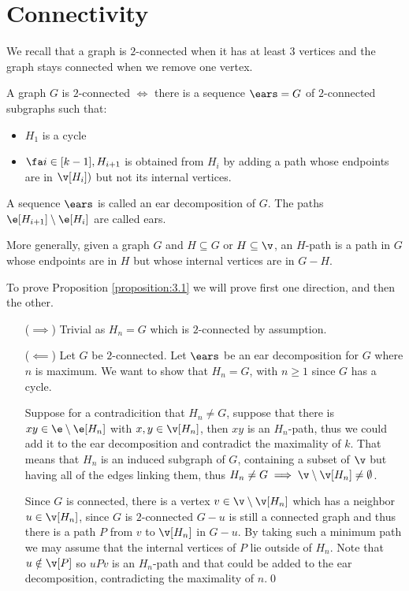 \chapter{Connectivity}
We recall that a graph is $2$-connected when it has at least $3$ vertices and the graph stays connected when we remove one vertex.
\begin{customproposition}{3.1}
\label{proposition:3.1}
    A graph $G$ is $2$-connected $\iff$ there is a sequence $\ears = G$ of $2$-connected subgraphs such that:
    \begin{itemize}
        \item $H_1$ is a cycle
        \item $\fa i \in [k - 1], H_{i + 1}$ is obtained from $H_i$ by adding a path whose endpoints are in $\v[H_i])$ but not its internal vertices.
    \end{itemize}
\end{customproposition}
\begin{definition}[Ears]
    A sequence $\ears$ is called an ear decomposition of $G$. The paths $\e[H_{i + 1}] \setminus \e[H_i]$ are called ears.
\end{definition}
More generally, given a graph $G$ and $H \subseteq G$ or $H \subseteq \v$, an $H$-path is a path in $G$ whose endpoints are in $H$ but whose internal vertices are in $G-H$.
\begin{prf}
    To prove Proposition \ref{proposition:3.1} we will prove first one direction, and then the other.
    \begin{itemize}
        \item [($\implies$)] Trivial as $H_n = G$ which is $2$-connected by assumption.
        \item [($\impliedby$)] Let $G$ be $2$-connected. Let $\ears$ be an ear decomposition for $G$ where $n$ is maximum. We want to show that $H_n = G$, with $n \geq 1$ since $G$ has a cycle.
        
        Suppose for a contradicition that $H_n \neq G$, suppose that there is $xy \in \e \setminus \e[H_n]$ with $x, y \in \v[H_n]$, then $xy$ is an $H_n$-path, thus we could add it to the ear decomposition and contradict the maximality of $k$. That means that $H_n$ is an induced subgraph of $G$, containing a subset of $\v$ but having all of the edges linking them, thus $H_n \neq G \implies \v \setminus \v[H_n] \neq \emptyset$.

        Since $G$ is connected, there is a vertex $v \in \v \setminus \v[H_n]$ which has a neighbor $u \in \v[H_n]$, since $G$ is $2$-connected $G - u$ is still a connected graph and thus there is a path $P$ from $v$ to $\v[H_n]$ in $G - u$. By taking such a minimum path we may assume that the internal vertices of $P$ lie outside of $H_n$. Note that $u \notin \v[P]$ so $uPv$ is an $H_n$-path and that could be added to the ear decomposition, contradicting the maximality of $n$.\qed
    \end{itemize}
\end{prf}
